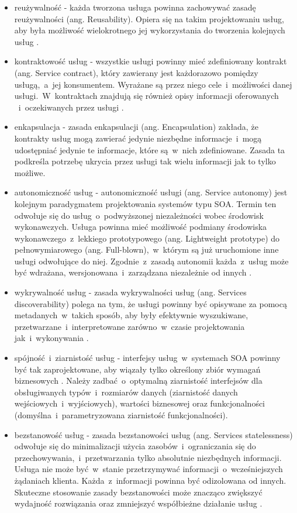 \begin{itemize}
\item{reużywalność - każda tworzona usługa powinna zachowywać zasadę reużywalności (ang. Reusability).  Opiera się na takim projektowaniu usług, aby była możliwość wielokrotnego jej wykorzystania do tworzenia kolejnych usług \cite{SOAsdj102009}.}
\item{kontraktowość usług - wszystkie usługi powinny mieć zdefiniowany kontrakt (ang. Service contract), który zawierany jest każdorazowo pomiędzy usługą,~a~jej konsumentem. Wyrażane są przez niego cele~i~możliwości danej usługi.~W~kontraktach znajdują się również opisy informacji oferowanych ~i~oczekiwanych przez usługi \cite{SOAinfoq10}.}
\item{enkapsulacja - zasada enkapsulacji (ang. Encapsulation) zakłada, że kontrakty usług mogą zawierać jedynie niezbędne informacje~i~mogą udostępniać jedynie te informacje, które są~w~nich zdefiniowane. Zasada ta podkreśla potrzebę ukrycia przez usługi tak wielu informacji jak to tylko możliwe.}
\item{autonomiczność usług - autonomiczność usługi (ang. Service autonomy) jest kolejnym paradygmatem projektowania systemów typu SOA. Termin ten odwołuje się do usług~o~podwyższonej niezależności wobec środowisk wykonawczych. Usługa powinna mieć możliwość podmiany środowiska wykonawczego~z~lekkiego prototypowego (ang. Lightweight prototype) do pełnowymiarowego (ang. Full-blown),~w~którym są już uruchomione inne usługi odwołujące do niej. Zgodnie~z~zasadą autonomii każda~z~usług może być wdrażana, wersjonowana~i~zarządzana niezależnie od innych \cite{SOAinfoq10}.}
\item{wykrywalność usług - zasada wykrywalności usług (ang. Services discoverability) polega na tym, że usługi powinny być opisywane za pomocą metadanych~w~takich sposób, aby były efektywnie wyszukiwane, przetwarzane~i~interpretowane zarówno~w~czasie projektowania jak~i~wykonywania \cite{SOAinfoq10}.}
\item{spójność~i~ziarnistość usług - interfejsy usług~w~systemach SOA powinny być tak zaprojektowane, aby wiązały tylko określony zbiór wymagań biznesowych \cite{SOAsdj102009}. Należy zadbać~o~optymalną ziarnistość interfejsów dla obsługiwanych typów~i~rozmiarów danych (ziarnistość danych wejściowych~i~wyjściowych), wartości biznesowej oraz funkcjonalności (domyślna~i~parametryzowana ziarnistość funkcjonalności).}
\item{bezstanowość usług - zasada bezstanowości usług (ang. Services statelessness) odwołuje się do minimalizacji użycia zasobów~i~ograniczania się do przechowywania,~i~przetwarzania tylko absolutnie niezbędnych informacji. Usługa nie może być~w~stanie przetrzymywać informacji~o~wcześniejszych żądaniach klienta. Każda~z~informacji powinna być odizolowana od innych. Skuteczne stosowanie zasady bezstanowości może znacząco zwiększyć wydajność rozwiązania oraz zmniejszyć współbieżne działanie usług \cite{SOAsdj102009}.}

\end{itemize}
